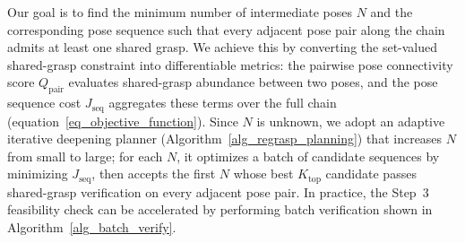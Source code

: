 \documentclass[journal, twoside]{IEEEtran}
\begin{document}
Our goal is to find the minimum number of intermediate poses $N$ and the corresponding pose sequence such that every adjacent pose pair along the chain admits at least one shared grasp. We achieve this by converting the set-valued shared-grasp constraint into differentiable metrics: the pairwise pose connectivity score $Q_\mathrm{pair}$ evaluates shared-grasp abundance between two poses, and the pose sequence cost $J_\mathrm{seq}$ aggregates these terms over the full chain (equation~\eqref{eq_objective_function}). Since $N$ is unknown, we adopt an adaptive iterative deepening planner (Algorithm~\ref{alg_regrasp_planning}) that increases $N$ from small to large; for each $N$, it optimizes a batch of candidate sequences by minimizing $J_\mathrm{seq}$, then accepts the first $N$ whose best $K_{\mathrm{top}}$ candidate passes shared-grasp verification on every adjacent pose pair. In practice, the Step~3 feasibility check can be accelerated by performing batch verification shown in Algorithm~\ref{alg_batch_verify}.
\end{document}
